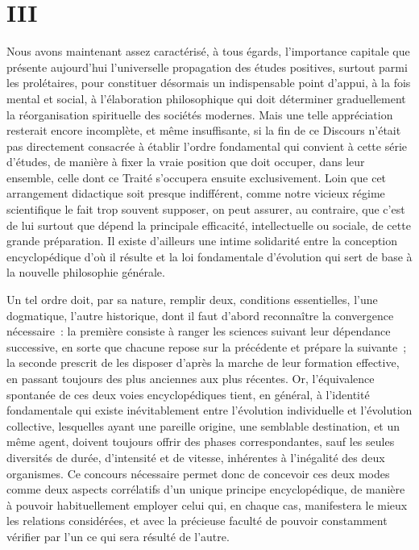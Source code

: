 \documentclass[french,twoside]{book} %
\begin{document}
\section[{III}]{III}
\label{III}\renewcommand{\leftmark}{III}

\noindent Nous avons maintenant assez caractérisé, à tous égards, l’importance capitale que présente aujourd’hui l’universelle propagation des études positives, surtout parmi les prolétaires, pour constituer désormais un indispensable point d’appui, à la fois mental et social, à l’élaboration philosophique qui doit déterminer graduellement la réorganisation spirituelle des sociétés modernes. Mais une telle appréciation resterait encore incomplète, et même insuffisante, si la fin de ce Discours n’était pas directement consacrée à établir l’ordre fondamental qui convient à cette série d’études, de manière à fixer la vraie position que doit occuper, dans leur ensemble, celle dont ce Traité s’occupera ensuite exclusivement. Loin que cet arrangement didactique soit presque indifférent, comme notre vicieux régime scientifique le fait trop souvent supposer, on peut assurer, au contraire, que c’est de lui surtout que dépend la principale efficacité, intellectuelle ou sociale, de cette grande préparation. Il existe d’ailleurs une intime solidarité entre la conception encyclopédique d’où il résulte et la loi fondamentale d’évolution qui sert de base à la nouvelle philosophie générale.\par
Un tel ordre doit, par sa nature, remplir deux, conditions essentielles, l’une dogmatique, l’autre historique, dont il faut d’abord reconnaître la convergence nécessaire : la première consiste à ranger les sciences suivant leur dépendance successive, en sorte que chacune repose sur la précédente et prépare la suivante ; la seconde prescrit de les disposer d’après la marche de leur formation effective, en passant toujours des plus anciennes aux plus récentes. Or, l’équivalence spontanée de ces deux voies encyclopédiques tient, en général, à l’identité fondamentale qui existe inévitablement entre l’évolution individuelle et l’évolution collective, lesquelles ayant une pareille origine, une semblable destination, et un même agent, doivent toujours offrir des phases correspondantes, sauf les seules diversités de durée, d’intensité et de vitesse, inhérentes à l’inégalité des deux organismes. Ce concours nécessaire permet donc de concevoir ces deux modes comme deux aspects corrélatifs d’un unique principe encyclopédique, de manière à pouvoir habituellement employer celui qui, en chaque cas, manifestera le mieux les relations considérées, et avec la précieuse faculté de pouvoir constamment vérifier par l’un ce qui sera résulté de l’autre.\par
\end{document}

